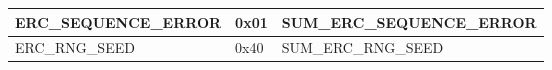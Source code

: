 \begin{longtable}{|l|l|l|}
\begin{minipage}{0.38\linewidth}\raggedright\vspace{.75ex}ERC\_SEQUENCE\_ERROR\vspace{.75ex}\end{minipage} & \begin{minipage}{0.15\linewidth}\raggedright\vspace{.75ex}0x01\vspace{.75ex}\end{minipage} & \begin{minipage}{0.38\linewidth}\raggedright\vspace{.75ex}SUM\_ERC\_SEQUENCE\_ERROR\vspace{.75ex}\end{minipage}\\\hline
\begin{minipage}{0.38\linewidth}\raggedright\vspace{.75ex}ERC\_RNG\_SEED\vspace{.75ex}\end{minipage} & \begin{minipage}{0.15\linewidth}\raggedright\vspace{.75ex}0x40\vspace{.75ex}\end{minipage} & \begin{minipage}{0.38\linewidth}\raggedright\vspace{.75ex}SUM\_ERC\_RNG\_SEED\vspace{.75ex}\end{minipage}\\\hline
\end{longtable}